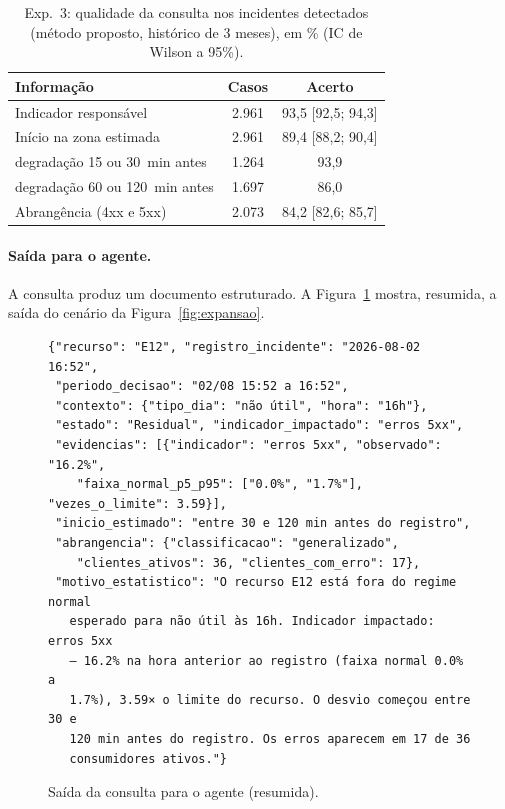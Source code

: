 \documentclass[sigconf,nonacm]{acmart}
\begin{document}
\begin{table}[t]
  \caption{Exp.~3: qualidade da consulta nos incidentes detectados (método proposto, histórico de 3 meses), em \% (IC de Wilson a 95\%).}
  \label{tab:consulta}
  \small
  \begin{tabular}{lcc}
    \toprule
    Informação & Casos & Acerto \\
    \midrule
    Indicador responsável & 2.961 & 93,5 [92,5; 94,3] \\
    Início na zona estimada & 2.961 & 89,4 [88,2; 90,4] \\
    \quad degradação 15 ou 30~min antes & 1.264 & 93,9 \\
    \quad degradação 60 ou 120~min antes & 1.697 & 86,0 \\
    Abrangência (4xx e 5xx) & 2.073 & 84,2 [82,6; 85,7] \\
    \bottomrule
  \end{tabular}
\end{table}

\paragraph{Saída para o agente.} A consulta produz um documento estruturado. A Figura~\ref{fig:json} mostra, resumida, a saída do cenário da Figura~\ref{fig:expansao}.

\begin{figure}[t]
\begin{Verbatim}[fontsize=\scriptsize,frame=single]
{"recurso": "E12", "registro_incidente": "2026-08-02 16:52",
 "periodo_decisao": "02/08 15:52 a 16:52",
 "contexto": {"tipo_dia": "não útil", "hora": "16h"},
 "estado": "Residual", "indicador_impactado": "erros 5xx",
 "evidencias": [{"indicador": "erros 5xx", "observado": "16.2%",
    "faixa_normal_p5_p95": ["0.0%", "1.7%"], "vezes_o_limite": 3.59}],
 "inicio_estimado": "entre 30 e 120 min antes do registro",
 "abrangencia": {"classificacao": "generalizado",
    "clientes_ativos": 36, "clientes_com_erro": 17},
 "motivo_estatistico": "O recurso E12 está fora do regime normal
   esperado para não útil às 16h. Indicador impactado: erros 5xx
   — 16.2% na hora anterior ao registro (faixa normal 0.0% a
   1.7%), 3.59× o limite do recurso. O desvio começou entre 30 e
   120 min antes do registro. Os erros aparecem em 17 de 36
   consumidores ativos."}
\end{Verbatim}
\caption{Saída da consulta para o agente (resumida).}
\label{fig:json}
\end{figure}
\end{document}
